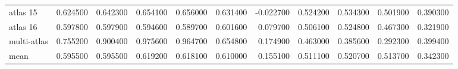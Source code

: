 \documentclass[a4paper]{article}
\begin{document}
\begin{landscape}
\begin{tabular}{lrrrrrrrrrr}
atlas 15 & 0.624500 & 0.642300 & 0.654100 & 0.656000 & 0.631400 & -0.022700 & 0.524200 & 0.534300 & 0.501900 & 0.390300 \\
atlas 16 & 0.597800 & 0.597900 & 0.594600 & 0.589700 & 0.601600 & 0.079700 & 0.506100 & 0.524800 & 0.467300 & 0.321900 \\
multi-atlas & 0.755200 & 0.900400 & 0.975600 & 0.964700 & 0.654800 & 0.174900 & 0.463000 & 0.385600 & 0.292300 & 0.399400 \\
mean & 0.595500 & 0.595500 & 0.619200 & 0.618100 & 0.610000 & 0.155100 & 0.511100 & 0.520700 & 0.513700 & 0.342300 \\
\bottomrule
\end{tabular}

\end{landscape}
\end{document}
